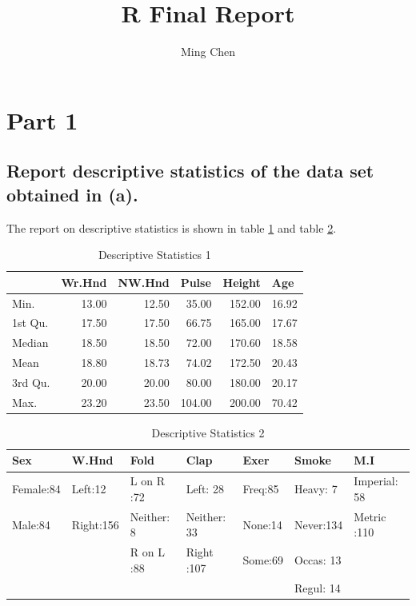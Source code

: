 \documentclass[12pt]{article}
\author{Ming Chen}
\title{R Final Report}
\begin{document}
\maketitle
\tableofcontents
\newpage
\section{Part 1}
\subsection{Report descriptive statistics of the data set obtained in (a).}
The report on descriptive statistics is shown in table \ref{tab1} and table \ref{tab2}.
\begin{table}[htbp]
	\centering
	\caption{Descriptive Statistics 1}
	\begin{tabular}{lrrrrr}
		\toprule[1.5pt]
		& \multicolumn{1}{l}{Wr.Hnd} & \multicolumn{1}{l}{NW.Hnd} & \multicolumn{1}{l}{Pulse} & \multicolumn{1}{l}{Height} & \multicolumn{1}{l}{Age} \\
		\toprule[1.5pt]
		Min.  & 13.00 & 12.50 & 35.00 & 152.00 & 16.92 \\
		1st Qu. & 17.50 & 17.50 & 66.75 & 165.00 & 17.67 \\
		Median & 18.50 & 18.50 & 72.00 & 170.60 & 18.58 \\
		Mean  & 18.80 & 18.73 & 74.02 & 172.50 & 20.43 \\
		3rd Qu. & 20.00 & 20.00 & 80.00 & 180.00 & 20.17 \\
		Max.  & 23.20 & 23.50 & 104.00 & 200.00 & 70.42 \\
		\toprule[1.5pt]
	\end{tabular}%
	\label{tab1}%
\end{table}%

\begin{table}[htbp]
	\centering
	\caption{Descriptive Statistics 2}
	\begin{tabular}{rrrrrlr}
		\toprule[1.5pt]
		\multicolumn{1}{l}{Sex} & \multicolumn{1}{l}{W.Hnd} & \multicolumn{1}{l}{Fold} & \multicolumn{1}{l}{Clap} & \multicolumn{1}{l}{Exer} & Smoke & \multicolumn{1}{l}{M.I} \\
		\toprule[1.5pt]
		\multicolumn{1}{l}{Female:84} & \multicolumn{1}{l}{Left:12} & \multicolumn{1}{l}{L on R :72} & \multicolumn{1}{l}{Left: 28} & \multicolumn{1}{l}{Freq:85} & Heavy:  7 & \multicolumn{1}{l}{Imperial: 58} \\
		\multicolumn{1}{l}{Male:84} & \multicolumn{1}{l}{Right:156} & \multicolumn{1}{l}{Neither: 8} & \multicolumn{1}{l}{Neither: 33} & \multicolumn{1}{l}{None:14} & Never:134 & \multicolumn{1}{l}{Metric  :110} \\
		&       & \multicolumn{1}{l}{R on L :88} & \multicolumn{1}{l}{Right  :107} & \multicolumn{1}{l}{Some:69} & Occas: 13 &  \\
		&       &       &       &       & Regul: 14 &  \\
		\toprule[1.5pt]
	\end{tabular}%
	\label{tab2}%
\end{table}%
\end{document}
